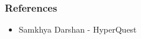 \begin{frame}[fragile]\frametitle{References}

      \begin{itemize}
        \item Samkhya Darshan - HyperQuest
      \end{itemize}

\end{frame}


